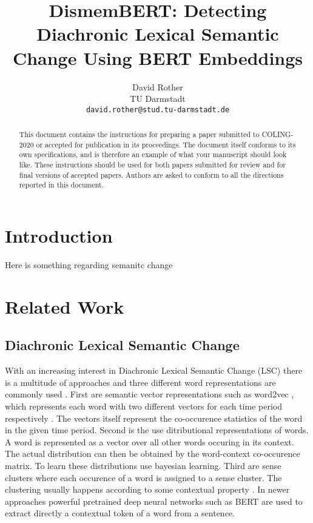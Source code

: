 \documentclass[11pt]{article}
\title{DismemBERT: Detecting Diachronic Lexical Semantic Change Using BERT Embeddings}
\author{David Rother \\
  TU Darmstadt \\
  {\tt david.rother@stud.tu-darmstadt.de} \\}
\date{}
\begin{document}
\maketitle
\begin{abstract}
  This document contains the instructions for preparing a paper submitted
  to COLING-2020 or accepted for publication in its proceedings. The document itself
  conforms to its own specifications, and is therefore an example of
  what your manuscript should look like. These instructions should be
  used for both papers submitted for review and for final versions of
  accepted papers. Authors are asked to conform to all the directions
  reported in this document.
\end{abstract}

\section{Introduction}
Here is something regarding semanitc change \cite{schlechtweg2018diachronic}

\section{Related Work}

\subsection{Diachronic Lexical Semantic Change}
With an increasing interest in Diachronic Lexical Semantic Change (LSC)  
there is a multitude of approaches and 
three different word representations are commonly used \cite{schlechtweg2019wind}. \newline
First are semantic vector representations such as word2vec \cite{mikolov2013efficient},
which represents each word with two different vectors for each time period respectively \cite{hamilton2016cultural,hamilton2016diachronic}.
The vectors itself represent the co-occurence statistics of the word in the given time period. \newline
Second is the use ditributional representations of words. 
A word is represented as a vector over all other words occuring in its context.
The actual distribution can then be obtained by the word-context co-occurence matrix.
To learn these distributions \cite{frermann2016bayesian} use bayesian learning. \newline
Third are sense clusters where each occurence of a word is assigned to a sense cluster.
The clustering usually happens according to some contextual property \cite{mitra2015automatic}.
In newer approaches powerful pretrained deep neural networks such as BERT \cite{hu2019diachronic,devlin2018bert}
are used to extract directly a contextual token of a word from a sentence.
\end{document}
